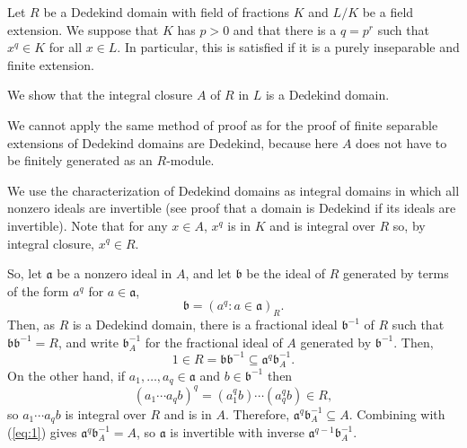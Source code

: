 \documentclass[12pt]{article}
\begin{document}
Let $R$ be a Dedekind domain with field of fractions $K$ and $L/K$ be a field extension. We suppose that $K$ has  $p>0$ and that there is a $q=p^r$ such that $x^q\in K$ for all $x\in L$. In particular, this is satisfied if it is a purely inseparable and finite extension.

We show that the integral closure $A$ of $R$ in $L$ is a Dedekind domain.

We cannot apply the same method of proof as for the proof of finite separable extensions of Dedekind domains are Dedekind, because here $A$ does not have to be finitely generated as an $R$-module.

We use the characterization of Dedekind domains as integral domains in which all nonzero ideals are invertible (see proof that a domain is Dedekind if its ideals are invertible).
Note that for any $x\in A$, $x^q$ is in $K$ and is integral over $R$ so, by integral closure, $x^q\in R$.

So, let $\mathfrak{a}$ be a nonzero ideal in $A$, and let $\mathfrak{b}$ be the ideal of $R$ generated by terms of the form $a^q$ for $a\in\mathfrak{a}$,
\begin{equation*}
\mathfrak{b}=\left(a^q:a\in \mathfrak{a}\right)_R.
\end{equation*}
Then, as $R$ is a Dedekind domain, there is a fractional ideal $\mathfrak{b}^{-1}$ of $R$ such that $\mathfrak{b}\mathfrak{b}^{-1}=R$, and write $\mathfrak{b}^{-1}_A$ for the fractional ideal of $A$ generated by $\mathfrak{b}^{-1}$. Then,
\begin{equation}\label{eq:1}
1\in R=\mathfrak{b}\mathfrak{b}^{-1}\subseteq\mathfrak{a}^q\mathfrak{b}^{-1}_A.
\end{equation}
On the other hand, if $a_1,\ldots,a_q\in\mathfrak{a}$ and $b\in\mathfrak{b}^{-1}$ then
\begin{equation*}
(a_1\cdots a_q b)^q=(a_1^qb)\cdots(a_q^qb)\in R,
\end{equation*}
so $a_1\cdots a_q b$ is integral over $R$ and is in $A$. Therefore, $\mathfrak{a}^q\mathfrak{b}^{-1}_A\subseteq A$. Combining with (\ref{eq:1}) gives $\mathfrak{a}^q\mathfrak{b}^{-1}_A=A$, so $\mathfrak{a}$ is invertible with inverse $\mathfrak{a}^{q-1}\mathfrak{b}^{-1}_A$.
\end{document}
